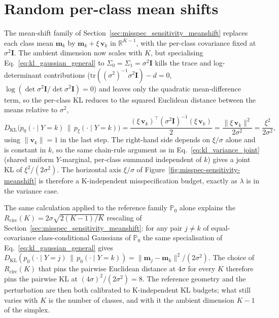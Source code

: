 \section{Random per-class mean shifts}

The mean-shift family of Section~\ref{sec:misspec_sensitivity_meanshift} replaces each class mean $\mathbf{m}_k$ by $\mathbf{m}_k + \xi\,\mathbf{v}_k$ in $\mathbb{R}^{K-1}$, with the per-class covariance fixed at $\sigma^2 \mathbf{I}$. The ambient dimension now scales with $K$, but specialising Eq.~\eqref{eq:kl_gaussian_general} to $\Sigma_0 = \Sigma_1 = \sigma^2 \mathbf{I}$ kills the trace and log-determinant contributions ($\mathrm{tr}((\sigma^2)^{-1}\sigma^2 \mathbf{I}) - d = 0$, $\log(\det \sigma^2 \mathbf{I}/\det \sigma^2 \mathbf{I}) = 0$) and leaves only the quadratic mean-difference term, so the per-class KL reduces to the squared Euclidean distance between the means relative to $\sigma^2$,
\begin{equation}\label{eq:kl_meanshift_perclass}
    D_{\mathrm{KL}}\bigl(p_0(\cdot \mid Y{=}k) \,\big\|\, p_\xi(\cdot \mid Y{=}k)\bigr) = \frac{(\xi\,\mathbf{v}_k)^\top (\sigma^2 \mathbf{I})^{-1} (\xi\,\mathbf{v}_k)}{2} = \frac{\|\xi\,\mathbf{v}_k\|^2}{2\sigma^2} = \frac{\xi^2}{2\sigma^2},
\end{equation}
using $\|\mathbf{v}_k\| = 1$ in the last step. The right-hand side depends on $\xi/\sigma$ alone and is constant in $k$, so the same chain-rule argument as in Eq.~\eqref{eq:kl_variance_joint} (shared uniform $Y$-marginal, per-class summand independent of $k$) gives a joint KL of $\xi^2/(2\sigma^2)$. The horizontal axis $\xi/\sigma$ of Figure~\ref{fig:misspec-sensitivity-meanshift} is therefore a K-independent misspecification budget, exactly as $\lambda$ is in the variance case.

The same calculation applied to the reference family $\mathbb{P}_0$ alone explains the $R_{\mathrm{circ}}(K) = 2\sigma\sqrt{2(K-1)/K}$ rescaling of Section~\ref{sec:misspec_sensitivity_meanshift}: for any pair $j \neq k$ of equal-covariance class-conditional Gaussians of $\mathbb{P}_0$ the same specialisation of Eq.~\eqref{eq:kl_gaussian_general} gives $D_{\mathrm{KL}}(p_0(\cdot \mid Y{=}j) \,\|\, p_0(\cdot \mid Y{=}k)) = \|\mathbf{m}_j - \mathbf{m}_k\|^2/(2\sigma^2)$. The choice of $R_{\mathrm{circ}}(K)$ that pins the pairwise Euclidean distance at $4\sigma$ for every $K$ therefore pins the pairwise KL at $(4\sigma)^2/(2\sigma^2) = 8$. The reference geometry and the perturbation are then both calibrated to K-independent KL budgets; what still varies with $K$ is the number of classes, and with it the ambient dimension $K-1$ of the simplex.
